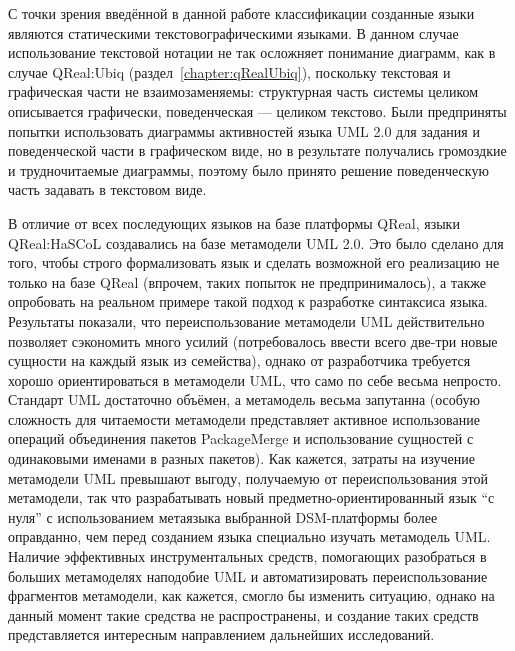 С точки зрения введённой в данной работе классификации созданные языки являются статическими 
текстовографическими языками. В данном случае использование текстовой нотации не так 
осложняет понимание диаграмм, как в случае QReal:Ubiq (раздел~\ref{chapter:qRealUbiq}), 
поскольку текстовая и графическая части не взаимозаменяемы: структурная часть системы 
целиком описывается графически, поведенческая --- целиком текстово. Были предприняты 
попытки использовать диаграммы активностей языка UML 2.0 для задания и поведенческой 
части в графическом виде, но в результате получались громоздкие и трудночитаемые диаграммы, 
поэтому было принято решение поведенческую часть задавать в текстовом виде.

В отличие от всех последующих языков на базе платформы QReal, языки QReal:HaSCoL создавались 
на базе метамодели UML 2.0. Это было сделано для того, чтобы строго формализовать 
язык и сделать возможной его реализацию не только на базе QReal (впрочем, таких попыток 
не предпринималось), а также опробовать на реальном примере такой подход к разработке 
синтаксиса языка. Результаты показали, что переиспользование метамодели UML действительно 
позволяет сэкономить много усилий (потребовалось ввести всего две-три новые сущности 
на каждый язык из семейства), однако от разработчика требуется хорошо ориентироваться
в метамодели UML, что само по себе весьма непросто. Стандарт UML достаточно объёмен, 
а метамодель весьма запутанна (особую сложность для читаемости метамодели представляет 
активное использование операций объединения пакетов PackageMerge и использование сущностей 
с одинаковыми именами в разных пакетов). Как кажется, затраты на изучение метамодели 
UML превышают выгоду, получаемую от переиспользования этой метамодели, так что разрабатывать 
новый предметно-ориентированный язык "`с нуля"' с использованием метаязыка выбранной 
DSM-платформы более оправданно, чем перед созданием языка специально изучать метамодель 
UML. Наличие эффективных инструментальных средств, помогающих разобраться в больших 
метамоделях наподобие UML и автоматизировать переиспользование фрагментов метамодели, 
как кажется, смогло бы изменить ситуацию, однако на данный момент такие средства не 
распространены, и создание таких средств представляется интересным направлением дальнейших 
исследований.
